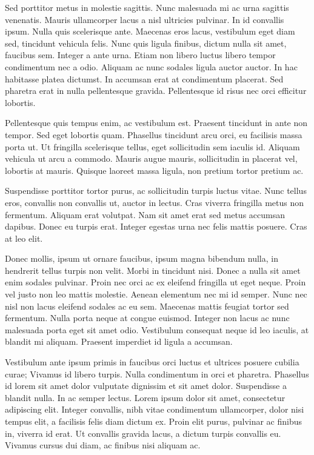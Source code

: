 Sed porttitor metus in molestie sagittis. Nunc malesuada mi ac urna sagittis
venenatis. Mauris ullamcorper lacus a nisl ultricies pulvinar. In id convallis
ipsum. Nulla quis scelerisque ante. Maecenas eros lacus, vestibulum eget diam
sed, tincidunt vehicula felis. Nunc quis ligula finibus, dictum nulla sit amet,
faucibus sem. Integer a ante urna. Etiam non libero luctus libero tempor
condimentum nec a odio. Aliquam ac nunc sodales ligula auctor auctor. In hac
habitasse platea dictumst. In accumsan erat at condimentum placerat. Sed
pharetra erat in nulla pellentesque gravida. Pellentesque id risus nec orci
efficitur lobortis.

Pellentesque quis tempus enim, ac vestibulum est. Praesent tincidunt in ante
non tempor. Sed eget lobortis quam. Phasellus tincidunt arcu orci, eu facilisis
massa porta ut. Ut fringilla scelerisque tellus, eget sollicitudin sem iaculis
id. Aliquam vehicula ut arcu a commodo. Mauris augue mauris, sollicitudin in
placerat vel, lobortis at mauris. Quisque laoreet massa ligula, non pretium
tortor pretium ac.

Suspendisse porttitor tortor purus, ac sollicitudin turpis luctus vitae. Nunc
tellus eros, convallis non convallis ut, auctor in lectus. Cras viverra
fringilla metus non fermentum. Aliquam erat volutpat. Nam sit amet erat sed
metus accumsan dapibus. Donec eu turpis erat. Integer egestas urna nec felis
mattis posuere. Cras at leo elit.

Donec mollis, ipsum ut ornare faucibus, ipsum magna bibendum nulla, in
hendrerit tellus turpis non velit. Morbi in tincidunt nisi. Donec a nulla sit
amet enim sodales pulvinar. Proin nec orci ac ex eleifend fringilla ut eget
neque. Proin vel justo non leo mattis molestie. Aenean elementum nec mi id
semper. Nunc nec nisl non lacus eleifend sodales ac eu sem. Maecenas mattis
feugiat tortor sed fermentum. Nulla porta neque at congue euismod. Integer non
lacus ac nunc malesuada porta eget sit amet odio. Vestibulum consequat neque id
leo iaculis, at blandit mi aliquam. Praesent imperdiet id ligula a accumsan.

Vestibulum ante ipsum primis in faucibus orci luctus et ultrices posuere
cubilia curae; Vivamus id libero turpis. Nulla condimentum in orci et pharetra.
Phasellus id lorem sit amet dolor vulputate dignissim et sit amet dolor.
Suspendisse a blandit nulla. In ac semper lectus. Lorem ipsum dolor sit amet,
consectetur adipiscing elit. Integer convallis, nibh vitae condimentum
ullamcorper, dolor nisi tempus elit, a facilisis felis diam dictum ex. Proin
elit purus, pulvinar ac finibus in, viverra id erat. Ut convallis gravida
lacus, a dictum turpis convallis eu. Vivamus cursus dui diam, ac finibus nisi
aliquam ac.

